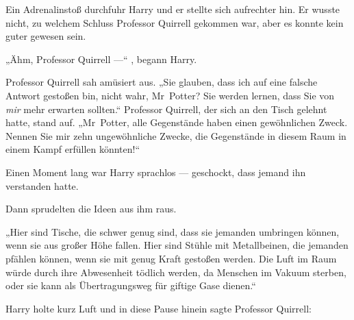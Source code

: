 Ein Adrenalinstoß durchfuhr Harry und er stellte sich aufrechter hin. Er wusste nicht, zu welchem Schluss Professor Quirrell gekommen war, aber es konnte kein guter gewesen sein.

„Ähm, Professor Quirrell —“ , begann Harry.

Professor Quirrell sah amüsiert aus.
„Sie glauben, dass ich auf eine falsche Antwort gestoßen bin, nicht wahr, Mr~Potter? Sie werden lernen, dass Sie von \emph{mir} mehr erwarten sollten.“ Professor Quirrell, der sich an den Tisch gelehnt hatte, stand auf.
„Mr~Potter, alle Gegenstände haben einen gewöhnlichen Zweck. Nennen Sie mir zehn ungewöhnliche Zwecke, die Gegenstände in diesem Raum in einem Kampf erfüllen könnten!“

Einen Moment lang war Harry sprachlos — geschockt, dass jemand ihn verstanden hatte.

Dann sprudelten die Ideen aus ihm raus.

„Hier sind Tische, die schwer genug sind, dass sie jemanden umbringen können, wenn sie aus großer Höhe fallen. Hier sind Stühle mit Metallbeinen, die jemanden pfählen können, wenn sie mit genug Kraft gestoßen werden. Die Luft im Raum würde durch ihre Abwesenheit tödlich werden, da Menschen im Vakuum sterben, oder sie kann als Übertragungsweg für giftige Gase dienen.“

Harry holte kurz Luft und in diese Pause hinein sagte Professor Quirrell:

